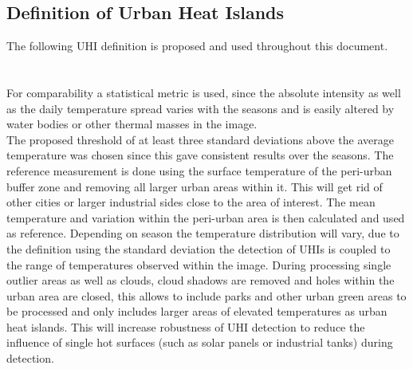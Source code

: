 \documentclass[12pt,a4paper, english,twoside]{article}
\begin{document}
    \subsection{Definition of Urban Heat Islands}\label{sec:definition}
    The following \gls{UHI} definition is proposed and used throughout this document.\\
    \\
    \noindent{}\\
% 
      For comparability a statistical metric is used, since the absolute intensity as well as the daily temperature spread varies with the seasons 
    and is easily altered by water bodies or other thermal masses in the image.\\ 
    The proposed threshold of at least three standard deviations above the average temperature was chosen since this gave consistent results over the seasons. 
    The reference measurement is done using the surface temperature of the peri-urban buffer zone and removing all larger urban areas within it. 
    This will get rid of other cities or larger industrial sides close to the area of interest.
    The mean temperature and variation within the peri-urban area is then calculated and used as reference.
    Depending on season the temperature distribution will vary, due to the definition using the standard deviation the detection of \glspl{UHI} is coupled to the range of temperatures observed within the image. 
    During processing single outlier areas as well as clouds, cloud shadows are removed and holes within the urban area are closed, this allows to include parks and other urban green areas to be processed and only includes larger areas of elevated temperatures as urban heat islands. 
    This will increase robustness of \gls{UHI} detection to reduce the influence of single hot surfaces (such as solar panels or industrial tanks) during detection.
\end{document}
